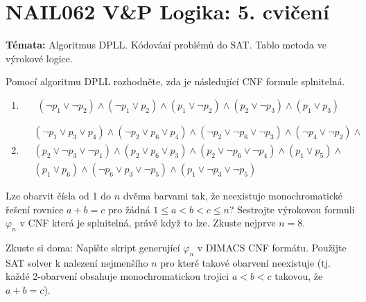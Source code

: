 \documentclass[a4paper,12pt]{article}
\begin{document}
\section*{NAIL062 V\&P Logika: 5. cvičení}


\textbf{Témata:} 
Algoritmus DPLL. Kódování problémů do SAT. Tablo metoda ve výrokové logice. 


\medskip\begin{problem}
    Pomocí algoritmu DPLL rozhodněte, zda je následující CNF formule splnitelná.
    \begin{enumerate}
        \item $$ (\neg p_1 \lor \neg p_2)\land( \neg p_1 \lor p_2)\land( p_1 \lor \neg p_2)\land( p_2 \lor \neg p_3)\land( p_1 \lor p_3)$$
        \item \begin{align*}
            &(\neg p_1 \lor p_3 \lor p_4)\land( \neg p_2 \lor p_6 \lor p_4)\land( \neg p_2 \lor \neg p_6 \lor \neg p_3)\land(
                \neg p_4 \lor \neg p_2)\land \\ & ( p_2 \lor \neg p_3 \lor \neg p_1)\land ( p_2 \lor p_6 \lor p_3)\land
                ( p_2 \lor \neg p_6 \lor \neg p_4)\land
                ( p_1 \lor p_5)\land \\ & ( p_1 \lor p_6)\land(
                \neg p_6 \lor p_3 \lor \neg p_5)\land( p_1 \lor \neg p_3 \lor \neg p_5)    
        \end{align*}
    \end{enumerate}
\end{problem}


        
        
    \medskip\begin{problem}
        Lze obarvit čísla od 1 do $n$ dvěma barvami tak, že neexistuje monochromatické řešení rovnice
        $a+b=c$ pro žádná $1\leq a<b<c\leq n$? Sestrojte výrokovou formuli $\varphi_n$ v CNF která je splnitelná, právě když to lze. Zkuste nejprve $n=8$.
        
        Zkuste si doma: Napište skript generující $\varphi_n$ v DIMACS CNF formátu. Použijte SAT solver k nalezení nejmenšího $n$ pro které takové obarvení neexistuje (tj. každé 2-obarvení obsahuje monochromatickou trojici $a<b<c$ takovou, že $a+b=c$).
    \end{problem}
    
\end{document}
